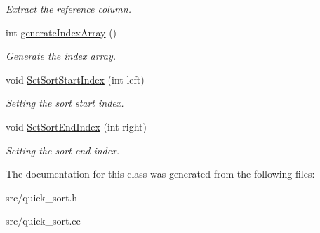 \begin{DoxyCompactItemize}
\begin{DoxyCompactList}\small\item\em Extract the reference column. \item\end{DoxyCompactList}\item 
\hypertarget{classquick__sort_a4e846b42a2873bbf01e58567e54ec2e0}{
int \hyperlink{classquick__sort_a4e846b42a2873bbf01e58567e54ec2e0}{generateIndexArray} ()}
\label{db/df3/classquick__sort_a4e846b42a2873bbf01e58567e54ec2e0}

\begin{DoxyCompactList}\small\item\em Generate the index array. \item\end{DoxyCompactList}\item 
\hypertarget{classquick__sort_a9e0b9731d50bb992168477280687df61}{
void \hyperlink{classquick__sort_a9e0b9731d50bb992168477280687df61}{SetSortStartIndex} (int left)}
\label{db/df3/classquick__sort_a9e0b9731d50bb992168477280687df61}

\begin{DoxyCompactList}\small\item\em Setting the sort start index. \item\end{DoxyCompactList}\item 
\hypertarget{classquick__sort_aecb65f88038e7b6794242429682d2819}{
void \hyperlink{classquick__sort_aecb65f88038e7b6794242429682d2819}{SetSortEndIndex} (int right)}
\label{db/df3/classquick__sort_aecb65f88038e7b6794242429682d2819}

\begin{DoxyCompactList}\small\item\em Setting the sort end index. \item\end{DoxyCompactList}\end{DoxyCompactItemize}


The documentation for this class was generated from the following files:\begin{DoxyCompactItemize}
\item 
src/quick\_\-sort.h\item 
src/quick\_\-sort.cc\end{DoxyCompactItemize}
